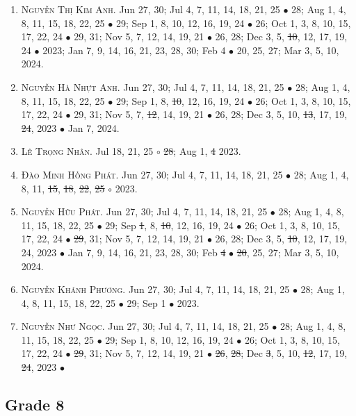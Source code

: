 \documentclass{article}
\begin{document}
\begin{enumerate}
	\item \textsc{Nguyễn Thị Kim Anh.} {\sf[In]} Jun 27, 30; Jul 4, 7, 11, 14, 18, 21, 25 $\bullet$ 28; Aug 1, 4, 8, 11, 15, 18, 22, 25 $\bullet$ 29; Sep 1, 8, 10, 12, 16, 19, 24 $\bullet$ 26; Oct 1, 3, 8, 10, 15, 17, 22, 24 $\bullet$ 29, 31; Nov 5, 7, 12, 14, 19, 21 $\bullet$ 26, 28; Dec 3, 5, \st{10}, 12, 17, 19, 24 $\bullet$ 2023; Jan 7, 9, 14, 16, 21, 23, 28, 30; Feb 4 $\bullet$ 20, 25, 27; Mar 3, 5, 10, 2024.
	\item \textsc{Nguyễn Hà Nhựt Anh.} {\sf[In]} Jun 27, 30; Jul 4, 7, 11, 14, 18, 21, 25 $\bullet$ 28; Aug 1, 4, 8, 11, 15, 18, 22, 25 $\bullet$ 29; Sep 1, 8, \st{10}, 12, 16, 19, 24 $\bullet$ 26; Oct 1, 3, 8, 10, 15, 17, 22, 24 $\bullet$ 29, 31; Nov 5, 7, \st{12}, 14, 19, 21 $\bullet$ 26, 28; Dec 3, 5, 10, \st{13}, 17, 19, \st{24}, 2023 $\bullet$ Jan 7, 2024. {\sf[Out]}
	\item \textsc{Lê Trọng Nhân.} {\sf[In]} Jul 18, 21, 25 $\circ$ \st{28}; Aug 1, \st{4} 2023. \sf{[Out]}
	\item \textsc{Đào Minh Hồng Phát.} {\sf[In]} Jun 27, 30; Jul 4, 7, 11, 14, 18, 21, 25 $\bullet$ 28; Aug 1, 4, 8, 11, \st{15}, \st{18}, \st{22}, \st{25} $\circ$ 2023. \sf{[Out]}
	\item \textsc{Nguyễn Hữu Phát.} {\sf[In]} Jun 27, 30; Jul 4, 7, 11, 14, 18, 21, 25 $\bullet$ 28; Aug 1, 4, 8, 11, 15, 18, 22, 25 $\bullet$ 29; Sep \st{1}, 8, \st{10}, 12, 16, 19, 24 $\bullet$ 26; Oct 1, 3, 8, 10, 15, 17, 22, 24 $\bullet$ \st{29}, 31; Nov 5, 7, 12, 14, 19, 21 $\bullet$ 26, 28; Dec 3, 5, \st{10}, 12, 17, 19, 24, 2023 $\bullet$ Jan 7, 9, 14, 16, 21, 23, 28, 30; Feb \st{4} $\bullet$ \st{20}, 25, 27; Mar 3, 5, 10, 2024.
	\item \textsc{Nguyễn Khánh Phương.} {\sf[In]} Jun 27, 30; Jul 4, 7, 11, 14, 18, 21, 25 $\bullet$ 28; Aug 1, 4, 8, 11, 15, 18, 22, 25 $\bullet$ 29; Sep 1 $\bullet$ 2023. \sf{[Out]}
	\item \textsc{Nguyễn Như Ngọc.} {\sf[In]} Jun 27, 30; Jul 4, 7, 11, 14, 18, 21, 25 $\bullet$ 28; Aug 1, 4, 8, 11, 15, 18, 22, 25 $\bullet$ 29; Sep 1, 8, 10, 12, 16, 19, 24 $\bullet$ 26; Oct 1, 3, 8, 10, 15, 17, 22, 24 $\bullet$ \st{29}, 31; Nov 5, 7, 12, 14, 19, 21 $\bullet$ \st{26}, \st{28}; Dec \st{3}, 5, 10, \st{12}, 17, 19, \st{24}, 2023 $\bullet$ {\sf[Out]}
\end{enumerate}

\subsection{Grade 8}
\end{document}
